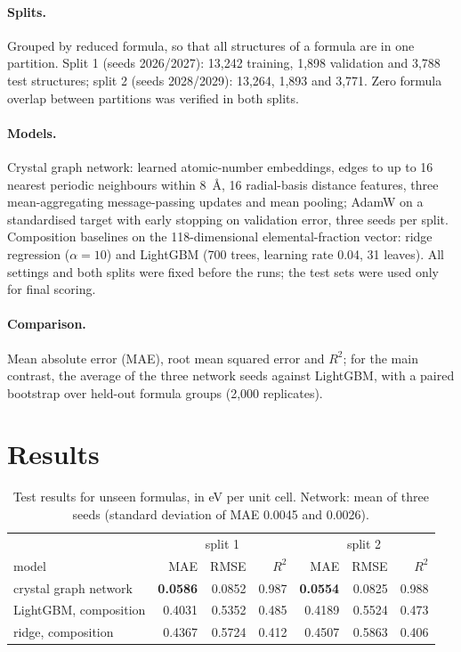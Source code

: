 \documentclass[11pt]{article}
\begin{document}
\paragraph{Splits.} Grouped by reduced formula, so that all structures of a formula are in one partition. Split 1
(seeds 2026/2027): 13,242 training, 1,898 validation and 3,788 test structures; split 2 (seeds 2028/2029): 13,264,
1,893 and 3,771. Zero formula overlap between partitions was verified in both splits.
\paragraph{Models.} Crystal graph network: learned atomic-number embeddings, edges to up to 16 nearest periodic
neighbours within 8~\AA, 16 radial-basis distance features, three mean-aggregating message-passing updates and mean
pooling; AdamW on a standardised target with early stopping on validation error, three seeds per split.
Composition baselines on the 118-dimensional elemental-fraction vector: ridge regression ($\alpha=10$) and LightGBM
(700 trees, learning rate 0.04, 31 leaves). All settings and both splits were fixed before the runs; the test sets
were used only for final scoring.
\paragraph{Comparison.} Mean absolute error (MAE), root mean squared error and $R^2$; for the main contrast, the
average of the three network seeds against LightGBM, with a paired bootstrap over held-out formula groups (2,000
replicates).

\section{Results}
\begin{table}[h]
\centering
\begin{tabular}{lrrrrrr}
\toprule
 & \multicolumn{3}{c}{split 1} & \multicolumn{3}{c}{split 2} \\
model & MAE & RMSE & $R^2$ & MAE & RMSE & $R^2$ \\
\midrule
crystal graph network & \textbf{0.0586} & 0.0852 & 0.987 & \textbf{0.0554} & 0.0825 & 0.988 \\
LightGBM, composition & 0.4031 & 0.5352 & 0.485 & 0.4189 & 0.5524 & 0.473 \\
ridge, composition & 0.4367 & 0.5724 & 0.412 & 0.4507 & 0.5863 & 0.406 \\
\bottomrule
\end{tabular}
\caption{Test results for unseen formulas, in eV per unit cell. Network: mean of three seeds (standard deviation of
MAE 0.0045 and 0.0026).}
\label{tab:results}
\end{table}
\end{document}
